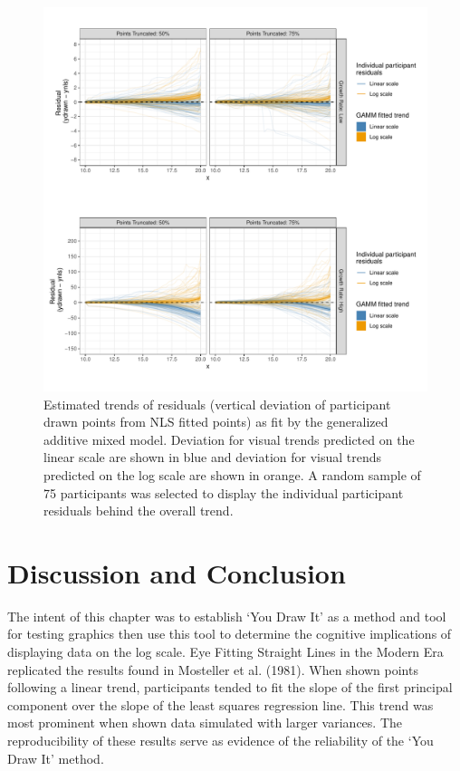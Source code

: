 \documentclass[print]{nuthesis}
\begin{document}
\begin{figure}[tbp]

{\centering \includegraphics[width=1\linewidth,]{thesis_files/figure-latex/exponential-prediction-gamm-preds-1} 

}

\caption[Exponential prediction GAMM results]{Estimated trends of residuals (vertical deviation of participant drawn points from NLS fitted points) as fit by the generalized additive mixed model. Deviation for visual trends predicted on the linear scale are shown in blue and deviation for visual trends predicted on the log scale are shown in orange. A random sample of 75 participants was selected to display the individual participant residuals behind the overall trend.}\label{fig:exponential-prediction-gamm-preds}
\end{figure}

\hypertarget{discussion-and-conclusion-1}{%
\section{Discussion and Conclusion}\label{discussion-and-conclusion-1}}

The intent of this chapter was to establish `You Draw It' as a method and tool for testing graphics then use this tool to determine the cognitive implications of displaying data on the log scale.
Eye Fitting Straight Lines in the Modern Era replicated the results found in Mosteller et al. (1981).
When shown points following a linear trend, participants tended to fit the slope of the first principal component over the slope of the least squares regression line.
This trend was most prominent when shown data simulated with larger variances.
The reproducibility of these results serve as evidence of the reliability of the `You Draw It' method.
\end{document}
